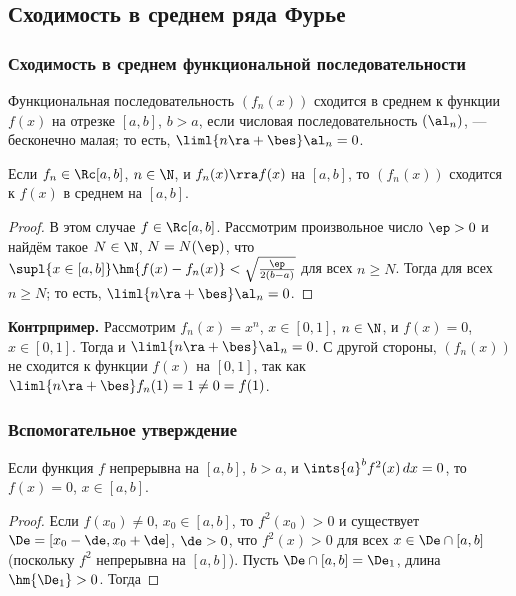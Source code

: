 \documentclass[a4paper]{article}
\newenvironment{stm*}{\par\vskip\theoremskip\textbf{Утверждение.}\normalfont \itshape}{\par\vskip\theoremskip}
\newenvironment{lem*}{\par\vskip\theoremskip\textbf{Лемма.}\normalfont \itshape}{\par\vskip\theoremskip}
\begin{document}
\subsection{Сходимость в среднем ряда Фурье}
\subsubsection{Сходимость в среднем функциональной
последовательности}

\begin{df}
Функциональная последовательность $(f_n(x))$ сходится в среднем к
функции $f(x)$ на отрезке $[a,b]$, $b>a$, если числовая
последовательность $(\al_n)$,  --- бесконечно малая; то есть,
$\liml{n\ra+\bes} \al_n=0$.
\end{df}

\begin{stm*}
Если $f_n\in\Rc[a,b]$, $n\in\N$, и $f_n(x) \rra f(x)$ на $[a,b]$, то
$(f_n(x))$ сходится к $f(x)$ в среднем на $[a,b]$.
\end{stm*}

\begin{proof}
В этом случае $f\in\Rc[a,b]$. Рассмотрим произвольное число $\ep>0$
и найдём такое $N\in\N$, $N=N(\ep)$, что $\supl{x\in[a,b]} \hm{f(x)
- f_n(x)} < \sqrt{\frac{\ep}{2(b-a)}}$ для всех $n\ge N$. Тогда
 для всех $n\ge N$; то
есть, $\liml{n\ra+\bes} \al_n=0$.
\end{proof}

\textbf{Контрпример.} Рассмотрим $f_n(x)=x^n$, $x\in[0,1]$,
$n\in\N$, и $f(x)=0$, $x\in[0,1]$. Тогда  и $\liml{n\ra+\bes} \al_n=0$.
С другой стороны, $(f_n(x))$ не сходится к функции $f(x)$ на
$[0,1]$, так как $\liml{n\ra+\bes} f_n(1)=1\ne0=f(1)$.

\subsubsection{Вспомогательное утверждение}

\begin{lem*}
Если функция $f$ непрерывна на $[a,b]$, $b>a$, и $\ints{a}^b
f^2(x)\,dx=0$, то $f(x)=0$, $x\in[a,b]$.
\end{lem*}

\begin{proof}
Если $f(x_0)\ne0$, $x_0\in[a,b]$, то $f^2(x_0)>0$ и существует $\De
= [x_0-\de,x_0+\de]$, $\de>0$, что $f^2(x)>0$ для всех $x\in
\De\cap[a,b]$ (поскольку $f^2$ непрерывна на $[a,b]$). Пусть
$\De\cap[a,b] = \De_1$, длина $\hm{\De_1}>0$. Тогда 
\end{proof}
\end{document}
